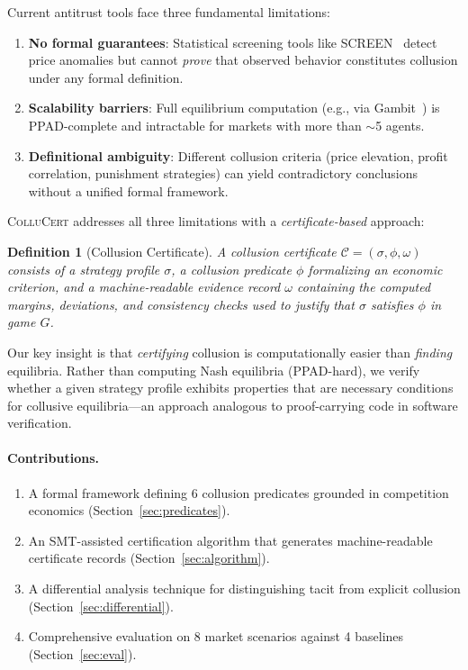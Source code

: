 \documentclass[11pt]{article}
\newtheorem{definition}[theorem]{Definition}
\begin{document}
Current antitrust tools face three fundamental limitations:
\begin{enumerate}[leftmargin=*]
\item \textbf{No formal guarantees}: Statistical screening tools like SCREEN~\cite{screen} detect price anomalies but cannot \emph{prove} that observed behavior constitutes collusion under any formal definition.
\item \textbf{Scalability barriers}: Full equilibrium computation (e.g., via Gambit~\cite{gambit}) is PPAD-complete and intractable for markets with more than $\sim$5 agents.
\item \textbf{Definitional ambiguity}: Different collusion criteria (price elevation, profit correlation, punishment strategies) can yield contradictory conclusions without a unified formal framework.
\end{enumerate}

\textsc{ColluCert} addresses all three limitations with a \emph{certificate-based} approach:

\begin{definition}[Collusion Certificate]
A collusion certificate $\mathcal{C} = (\sigma, \phi, \omega)$ consists of a strategy profile $\sigma$, a collusion predicate $\phi$ formalizing an economic criterion, and a machine-readable evidence record $\omega$ containing the computed margins, deviations, and consistency checks used to justify that $\sigma$ satisfies $\phi$ in game $G$.
\end{definition}

Our key insight is that \emph{certifying} collusion is computationally easier than \emph{finding} equilibria. Rather than computing Nash equilibria (PPAD-hard), we verify whether a given strategy profile exhibits properties that are necessary conditions for collusive equilibria---an approach analogous to proof-carrying code in software verification.

\paragraph{Contributions.}
\begin{enumerate}
\item A formal framework defining 6 collusion predicates grounded in competition economics (Section~\ref{sec:predicates}).
\item An SMT-assisted certification algorithm that generates machine-readable certificate records (Section~\ref{sec:algorithm}).
\item A differential analysis technique for distinguishing tacit from explicit collusion (Section~\ref{sec:differential}).
\item Comprehensive evaluation on 8 market scenarios against 4 baselines (Section~\ref{sec:eval}).
\end{enumerate}
\end{document}
